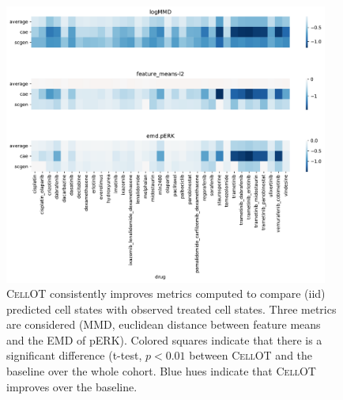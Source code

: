 \begin{figure}[h]
  \begin{center}
    \includegraphics[width=0.95\textwidth]{figures/cellot-cohort/supplement/iid-metrics-drugs}
  \end{center}
  \caption{\textsc{CellOT} consistently improves metrics computed to compare (iid) predicted cell states with observed treated cell states.
  Three metrics are considered (MMD, euclidean distance between feature means and the EMD of pERK). 
  Colored squares indicate that there is a significant difference (t-test, $p < 0.01$ between \textsc{CellOT} and the baseline over the whole cohort.
  Blue hues indicate that \textsc{CellOT} improves over the baseline.
  }\label{fig:cellot-cohort-iid-metrics}
\end{figure}

